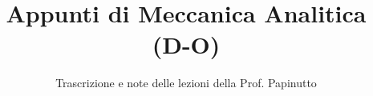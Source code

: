 \documentclass[a4paper,12pt]{article}
\title{Appunti di Meccanica Analitica (D-O)}
\author{Trascrizione e note delle lezioni della Prof. Papinutto}
\date{}
\begin{document}
\maketitle
\projectintro
\tableofcontents
\newpage

\end{document}
